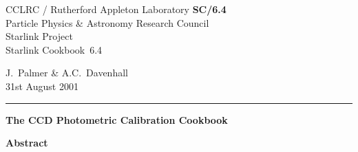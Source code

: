 \documentclass[twoside,11pt]{article}
\newcommand{\stardoccategory}  {Starlink Cookbook}
\newcommand{\stardocinitials}  {SC}
\newcommand{\stardocnumber}    {6.4}
\newcommand{\stardocauthors}   {J.~Palmer \& A.C.~Davenhall}
\newcommand{\stardocdate}      {31st August 2001}
\newcommand{\stardoctitle}     {The CCD Photometric Calibration Cookbook}
\newcommand{\stardocname}{\stardocinitials /\stardocnumber}
\newenvironment{latexonly}{}{}
\begin{document}
\thispagestyle{empty}

\begin{latexonly}
   CCLRC / {\sc Rutherford Appleton Laboratory} \hfill {\bf \stardocname}\\
   {\large Particle Physics \& Astronomy Research Council}\\
   {\large Starlink Project\\}
   {\large \stardoccategory\ \stardocnumber}
   \begin{flushright}
   \stardocauthors\\
   \stardocdate
   \end{flushright}
   \vspace{-4mm}
   \rule{\textwidth}{0.5mm}
   \vspace{5mm}
   \begin{center}
   {\Huge\bf  \stardoctitle \\ [2.5ex]}
   \end{center}
   \vspace{5mm}


   \vspace{10mm}
   \begin{center}
      {\Large\bf Abstract}
   \end{center}
\end{latexonly}
\end{document}
